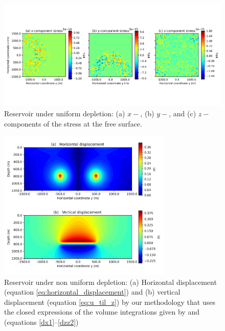 \documentclass[journal abbreviation, manuscript]{copernicus}
\begin{document}
\begin{figure}[ht]
\includegraphics[width=12cm]{Fig/Figure_Null_stress.png}
\caption{Reservoir under uniform depletion: (a) $x-$, (b) $y-$, and (c) $z-$components of the stress at the free surface.}
\label{fig:Null_stress}
\end{figure}




\begin{figure}[ht]
\includegraphics[width=8.3cm]{Fig/Figure_Displacement_non_uniform_depletion.png}
\caption{Reservoir under non uniform depletion: (a) Horizontal displacement (equation \ref{eq:horizontal_displacement}) and (b) vertical displacement (equation \ref{eq:u_til_z}) by our methodology that uses the closed expressions of the volume integrations given by \cite{Nagyetal2000} and \cite{Nagyetal2002} (equations \ref{dx1}--\ref{dzz2})}
\label{fig:displacement_non_uniform_depletion}
\end{figure}
\end{document}
